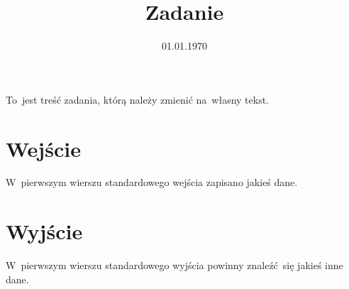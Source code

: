 \documentclass[zad]{soigstyl}
\date{01.01.1970}
\title{\mbox{Zadanie}}
\begin{document}
\begin{tasktext}%
    \noindent
    To~jest treść zadania, którą należy zmienić na~własny tekst.
	
    	\section{Wejście}
	W~pierwszym wierszu standardowego wejścia zapisano jakieś dane. 

	\section{Wyjście}
	W~pierwszym wierszu standardowego wyjścia powinny znaleźć~się jakieś inne dane.
	
	\oigprzyklady
\end{tasktext}
\end{document}

